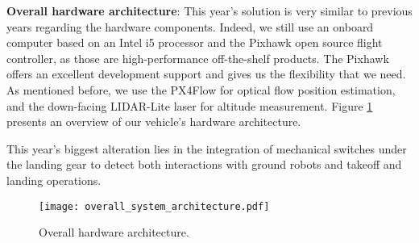 \textbf{Overall hardware architecture}: This year’s solution is very similar to previous years regarding the hardware components. Indeed, we still use an onboard computer based on an Intel i5 processor and the Pixhawk open source flight controller, as those are high-performance off-the-shelf products. The Pixhawk offers an excellent development support and gives us the flexibility that we need. As mentioned before, we use the PX4Flow for optical flow position estimation, and the down-facing LIDAR-Lite laser for altitude measurement. Figure \ref{fig:intro-hardware} presents an overview of our vehicle’s hardware architecture.

This year's biggest alteration lies in the integration of mechanical switches under the landing gear to detect both interactions with ground robots and takeoff and landing operations.

\begin{figure}[h]
	\texttt{[image: overall\_system\_architecture.pdf]}
	\vspace{-0.5cm}
	\caption{Overall hardware architecture.}
	\label{fig:intro-hardware}
\end{figure}
